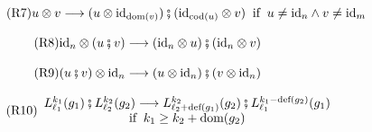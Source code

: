 \documentclass[12pt, a4paper]{article}
\newcommand{\layer}[3]{L^{\smash{#1}}_{\smash{#2}}(#3)}
\begin{document}
\begin{figure}[h]
{\begin{minipage}{0.982\linewidth}
\begin{center}
        \vspace{-0.3em}
        \hspace{-0.8em}
        \begin{subfigure}{0.82\textwidth}
            \begin{equation}\label{ru:par}\tag{R7}
                u\otimes v \longrightarrow (u\otimes\textup{id}_{\textup{dom}(v)})\fatsemi(\textup{id}_{\textup{cod}(u)}\otimes v)
                \;\;\text{if}\;\; u\ne\textup{id}_n\wedge v\ne\textup{id}_m
            \end{equation}
        \end{subfigure}

        \vspace{-0.3em}
        \hspace{-0.8em}
        \begin{subfigure}{0.54\textwidth}
            \begin{equation}\label{ru:parseqidleft}\tag{R8}
                \textup{id}_n\otimes(u\fatsemi v) \longrightarrow (\textup{id}_n\otimes u)\fatsemi(\textup{id}_n\otimes v)
            \end{equation}
        \end{subfigure}

        \vspace{-0.3em}
        \hspace{-0.8em}
        \begin{subfigure}{0.54\textwidth}
            \begin{equation}\label{ru:parseqidright}\tag{R9}
                (u\fatsemi v)\otimes\textup{id}_n \longrightarrow (u\otimes\textup{id}_n)\fatsemi(v\otimes\textup{id}_n)
            \end{equation}
        \end{subfigure}

        \vspace{-0.3em}
        \hspace{-0.8em}
        \begin{subfigure}{0.73\textwidth}
            \begin{equation}\label{ru:layercom}\tag{R10}
                \begin{array}{c}
                    \layer{k_1}{\ell_1}{g_1}\fatsemi\layer{k_2}{\ell_2}{g_2} \longrightarrow \layer{k_2}{\ell_2+\textup{def}(g_1)}{g_2}\fatsemi \layer{k_1-\textup{def}(g_2)}{\ell_1}{g_1} \\
                    \text{if}\;\; k_1\ge k_2+\textup{dom}(g_2)
                \end{array}
            \end{equation}
        \end{subfigure}


\end{center}
\end{minipage}}
\end{figure}
\end{document}
